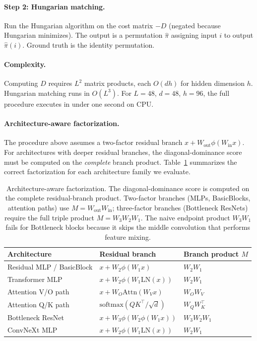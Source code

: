 \documentclass[wcp]{jmlr}
\begin{document}
\paragraph{Step 2: Hungarian matching.} Run the Hungarian algorithm on the cost matrix $-D$ (negated because Hungarian minimizes). The output is a permutation $\hat\pi$ assigning input $i$ to output $\hat\pi(i)$. Ground truth is the identity permutation.

\paragraph{Complexity.} Computing $D$ requires $L^2$ matrix products, each $O(dh)$ for hidden dimension $h$. Hungarian matching runs in $O(L^3)$. For $L{=}48$, $d{=}48$, $h{=}96$, the full procedure executes in under one second on CPU.

\paragraph{Architecture-aware factorization.} The procedure above assumes a two-factor residual branch $x + W_{\mathrm{out}} \phi(W_{\mathrm{in}} x)$. For architectures with deeper residual branches, the diagonal-dominance score must be computed on the \emph{complete} branch product. Table~\ref{tab:factorization} summarizes the correct factorization for each architecture family we evaluate.

\begin{table}[t]
\centering
\small
\begin{tabular}{lll}
\toprule
Architecture & Residual branch & Branch product $M$ \\
\midrule
Residual MLP / BasicBlock & $x + W_2 \phi(W_1 x)$ & $W_2 W_1$ \\
Transformer MLP & $x + W_2 \phi(W_1 \mathrm{LN}(x))$ & $W_2 W_1$ \\
Attention V/O path & $x + W_O \mathrm{Attn}(W_V x)$ & $W_O W_V$ \\
Attention Q/K path & $\mathrm{softmax}(Q K^\top / \sqrt{d})$ & $W_Q W_K^\top$ \\
Bottleneck ResNet & $x + W_3 \phi(W_2 \phi(W_1 x))$ & $W_3 W_2 W_1$ \\
ConvNeXt MLP & $x + W_2 \phi(W_1 \mathrm{LN}(x))$ & $W_2 W_1$ \\
\bottomrule
\end{tabular}
\caption{Architecture-aware factorization. The diagonal-dominance score is computed on the complete residual-branch product. Two-factor branches (MLPs, BasicBlocks, attention paths) use $M = W_{\mathrm{out}} W_{\mathrm{in}}$; three-factor branches (Bottleneck ResNets) require the full triple product $M = W_3 W_2 W_1$. The naive endpoint product $W_3 W_1$ fails for Bottleneck blocks because it skips the middle convolution that performs feature mixing.}
\label{tab:factorization}
\end{table}
\end{document}
